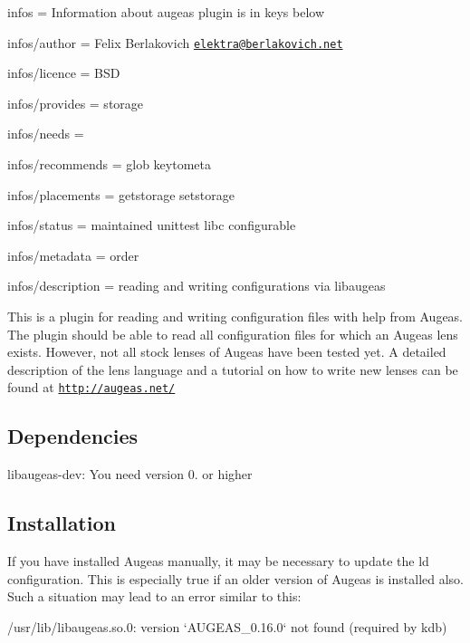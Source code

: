 
\begin{DoxyItemize}
\item infos = Information about augeas plugin is in keys below
\item infos/author = Felix Berlakovich \href{mailto:elektra@berlakovich.net}{\tt elektra@berlakovich.\+net}
\item infos/licence = B\+SD
\item infos/provides = storage
\item infos/needs =
\item infos/recommends = glob keytometa
\item infos/placements = getstorage setstorage
\item infos/status = maintained unittest libc configurable
\item infos/metadata = order
\item infos/description = reading and writing configurations via libaugeas
\end{DoxyItemize}

This is a plugin for reading and writing configuration files with help from Augeas. The plugin should be able to read all configuration files for which an Augeas lens exists. However, not all stock lenses of Augeas have been tested yet. A detailed description of the lens language and a tutorial on how to write new lenses can be found at \href{http://augeas.net/}{\tt http\+://augeas.\+net/}

\subsection*{Dependencies}


\begin{DoxyItemize}
\item {\ttfamily libaugeas-\/dev}\+: You need version 0. or higher
\end{DoxyItemize}

\subsection*{Installation}

If you have installed Augeas manually, it may be necessary to update the ld configuration. This is especially true if an older version of Augeas is installed also. Such a situation may lead to an error similar to this\+:


\begin{DoxyCode}
/usr/lib/libaugeas.so.0: version `AUGEAS\_0.16.0` not found (required by kdb)
\end{DoxyCode}


